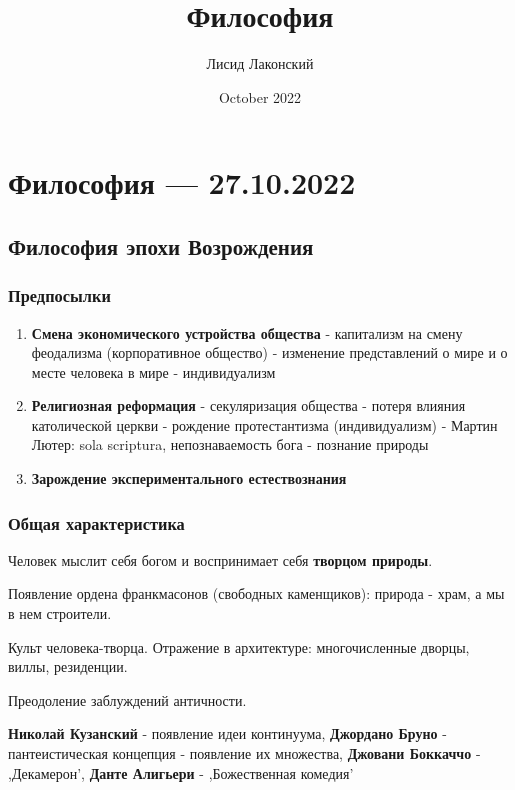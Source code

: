 \documentclass{article}
\title{Философия}
\author{Лисид Лаконский}
\date{October 2022}
\begin{document}
\maketitle
\tableofcontents
\pagebreak

\section{Философия — 27.10.2022}

\subsection{Философия эпохи Возрождения}

\begin{flushleft}

\subsubsection{Предпосылки}

\begin{enumerate}
    \item \textbf{Смена экономического устройства общества} - капитализм на смену феодализма (корпоративное общество) - изменение представлений о мире и о месте человека в мире - индивидуализм
    \item \textbf{Религиозная реформация} - секуляризация общества - потеря влияния католической церкви - рождение протестантизма (индивидуализм) - Мартин Лютер: sola scriptura, непознаваемость бога - познание природы
    \item \textbf{Зарождение экспериментального естествознания}
\end{enumerate}

\subsubsection{Общая характеристика}

Человек мыслит себя богом и воспринимает себя \textbf{творцом природы}.

Появление ордена франкмасонов (свободных каменщиков): природа - храм, а мы в нем строители.

Культ человека-творца. Отражение в архитектуре: многочисленные дворцы, виллы, резиденции.

Преодоление заблуждений античности.

\hfill

\textbf{Николай Кузанский} - появление идеи континуума, \textbf{Джордано Бруно} - пантеистическая концепция - появление их множества, \textbf{Джовани Боккаччо} - ,Декамерон', \textbf{Данте Алигьери} - ,Божественная комедия'


\end{flushleft}
\end{document}
